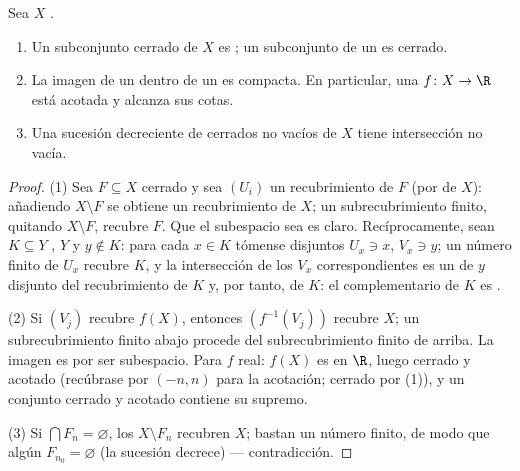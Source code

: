 \begin{theorem}\label{thm:b3:topology:compactprops}
Sea $X$ .
\begin{enumerate}
  \item Un subconjunto cerrado de $X$ es
  ; un subconjunto
   de un
   es cerrado.
  \item La imagen  de un
   dentro de un
   es
  compacta. En particular, una
  $f\colon X
        \to \R$  está
  acotada y alcanza sus cotas. \item Una sucesión decreciente de
  cerrados no vacíos de $X$ tiene intersección no vacía.
\end{enumerate}
\end{theorem}

\begin{proof}
(1) Sea $F \subseteq X$ cerrado y sea $(U_i)$ un recubrimiento 
de $F$ (por  de $X$): añadiendo $X \setminus F$ se obtiene un
recubrimiento  de $X$; un subrecubrimiento finito, quitando
$X \setminus F$, recubre $F$. Que el subespacio sea
 es claro.
Recíprocamente, sean $K \subseteq Y$
, $Y$
 y $y \notin K$: para
cada $x \in K$ tómense  disjuntos $U_x \ni x$, $V_x \ni y$; un
número finito de $U_x$ recubre $K$, y la intersección de los $V_x$
correspondientes es un  de $y$
disjunto del recubrimiento de $K$ y, por tanto, de $K$: el
complementario de $K$ es .

(2) Si $(V_j)$ recubre $f(X)$, entonces $(f^{-1}(V_j))$ recubre $X$; un
subrecubrimiento finito abajo procede del subrecubrimiento finito de
arriba. La imagen es 
por ser subespacio. Para $f$ real: $f(X)$ es
 en $\R$, luego cerrado y
acotado (recúbrase por $(-n, n)$ para la acotación; cerrado por (1)), y
un conjunto cerrado y acotado contiene su supremo.

(3) Si $\bigcap F_n = \varnothing$, los  $X \setminus F_n$
recubren $X$; bastan un número finito, de modo que algún $F_{n_0} =
\varnothing$ (la sucesión decrece) --- contradicción.
\end{proof}

